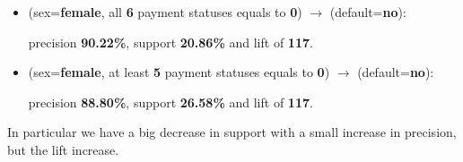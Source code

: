 \begin{itemize}
  \item (sex=\textbf{female}, all \textbf{6} payment statuses equals to \textbf{0}) $\rightarrow$ (default=\textbf{no}):
  
    \tab precision \textbf{90.22\%}, support \textbf{20.86\%} and lift of \textbf{117}.
    
  \item (sex=\textbf{female}, at least \textbf{5} payment statuses equals to \textbf{0}) $\rightarrow$ (default=\textbf{no}):
  
    \tab precision \textbf{88.80\%}, support \textbf{26.58\%} and lift of \textbf{117}.
    
\end{itemize}

In particular we have a big decrease in support with a small increase in precision, but the lift increase.
